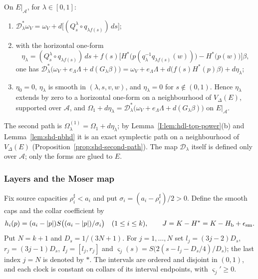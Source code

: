 \begin{lemma}\label{I:lem:hdl-suspension}
On $E|_{\mathcal A}$, for $\lambda\in[0,1]$:
\begin{enumerate}[label=(\roman*)]
\item $\mathcal D_\lambda^*\omega_V=\omega_V+d\big[(Q^\lambda_s\circ q_{\lambda f(s)})\,ds\big]$;
\item with the horizontal one-form
\[
 \eta_\lambda=(Q^\lambda_s\circ q_{\lambda f(s)})\,ds
 +f(s)\Big[H^*\big(p(q_\lambda^{-1}q_{\lambda f(s)}(w))\big)-H^*\big(p(w)\big)\Big]\beta ,
\]
one has
$\mathcal D_\lambda^*\big(\omega_V+e_\Lambda\Lambda+d(G_\lambda\beta)\big)=\omega_V+e_\Lambda\Lambda+d\big(f(s)H^*(p)\beta\big)+d\eta_\lambda$;
\item $\eta_0=0$, $\eta_\lambda$ is smooth in $(\lambda,s,v,w)$, and $\eta_\lambda=0$ for $s\notin(0,1)$.
Hence $\eta_\lambda$ extends by zero to a horizontal one-form on a neighbourhood of $V_\Delta(E)$, supported over
$\mathcal A$, and $\Omega_1+d\eta_\lambda=\mathcal D_\lambda^*\big(\omega_V+e_\Lambda\Lambda+d(G_\lambda\beta)\big)$ on $E|_{\mathcal A}$.
\end{enumerate}
\end{lemma}

The second path is $\Omega^{(1)}_\lambda=\Omega_1+d\eta_\lambda$; by Lemma~\ref{I:lem:hdl-top-power}(b) and
Lemma~\ref{lem:shd-nbhd} it is an exact symplectic path on a neighbourhood of $V_\Delta(E)$
(Proposition~\ref{prop:shd-second-path}). The map $\mathcal D_\lambda$ itself is defined only over $\mathcal A$; only
the forms are glued to $E$.

\subsubsection{Layers and the Moser map}\label{sec:hdl-layers}
Fix source capacities $\rho_i^\sharp<a_i$ and put $\sigma_i=(a_i-\rho_i^\sharp)/2>0$.
Define the smooth caps and the collar coefficient by
\begin{equation}\label{eq:hdl-caps}
 h_i(p)=(a_i-|p|)S\big((a_i-|p|)/\sigma_i\big)\quad(1\le i\le k),\qquad
 J=K-H^*=K-H_{\mathrm b}+\epsilon_{\rm sm} .
\end{equation}
Put $N=k+1$ and $D_s=1/(3N+1)$. For $j=1,\dots,N$ set
$l_j=(3j-2)D_s$, $r_j=(3j-1)D_s$, $I_j=[l_j,r_j]$ and
$\varsigma_j(s)=S\big(2(s-l_j-D_s/4)/D_s\big)$; the last index $j=N$ is denoted by $*$.
The intervals are ordered and disjoint in $(0,1)$, and each clock is constant on collars
of its interval endpoints, with $\varsigma_j'\ge0$.

